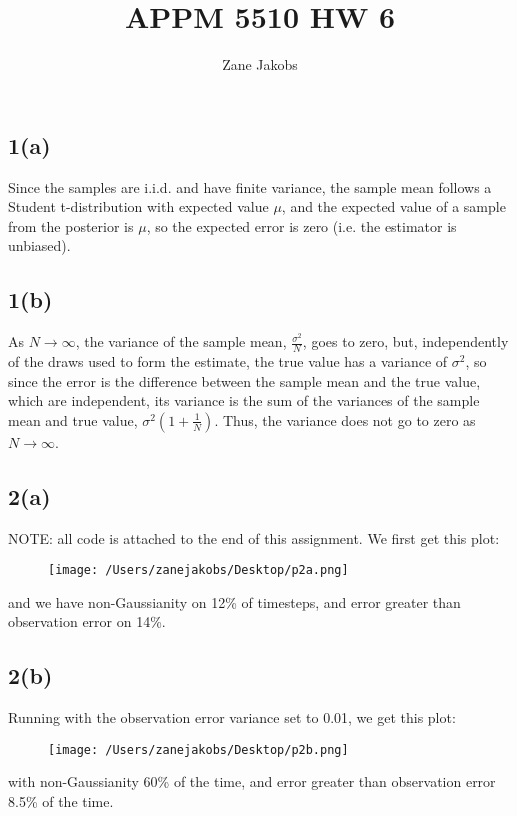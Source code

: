 \documentclass[11pt]{article}
\begin{document}
\title{APPM 5510 HW 6}
\author{Zane Jakobs}
\date{}
\maketitle


\subsection*{1(a)} Since the samples are i.i.d. and have finite variance, the sample mean follows a Student t-distribution with expected value $\mu$, and the expected value of a sample from the posterior is $\mu$, so the expected error is zero (i.e. the estimator is unbiased). 
\subsection*{1(b)} As $N\to\infty$, the variance of the sample mean, $\frac{\sigma^2}{N}$, goes to zero, but, independently of the draws used to form the estimate, the true value has a variance of $\sigma^2$, so since the error is the difference between the sample mean and the true value, which are independent, its variance is the sum of the variances of the sample mean and true value, $\sigma^2 (1 + \frac{1}{N})$. Thus, the variance does not go to zero as $N\to\infty$.

\subsection*{2(a)}
NOTE: all code is attached to the end of this assignment. We first get this plot:\\
\begin{figure}[H]
\texttt{[image: /Users/zanejakobs/Desktop/p2a.png]}
\end{figure}
and we have non-Gaussianity on 12\% of timesteps, and error greater than observation error on 14\%.
\subsection*{2(b)}
Running with the observation error variance set to 0.01, we get this plot:\\
\begin{figure}[H]
\texttt{[image: /Users/zanejakobs/Desktop/p2b.png]}
\end{figure}
with non-Gaussianity 60\% of the time, and error greater than observation error 8.5\% of the time.
\end{document}
